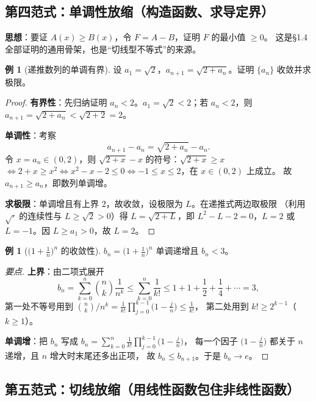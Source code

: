 \documentclass[11pt,a4paper]{ctexart}
\theoremstyle{definition}
\newtheorem{example}[theorem]{例}
\theoremstyle{remark}
\begin{document}
\subsection{第四范式：单调性放缩（构造函数、求导定界）}

\textbf{思想}：要证 $A(x)\ge B(x)$，令 $F=A-B$，证明 $F$ 的最小值 $\ge0$。
这是\S 1.4 全部证明的通用骨架，也是“切线型不等式”的来源。

\begin{example}[递推数列的单调有界]\label{ex:recursion}
设 $a_1=\sqrt2$，$a_{n+1}=\sqrt{2+a_n}$。证明 $\{a_n\}$ 收敛并求极限。
\end{example}

\begin{proof}
\textbf{有界性}：先归纳证明 $a_n<2$。$a_1=\sqrt2<2$；若 $a_n<2$，则
$a_{n+1}=\sqrt{2+a_n}<\sqrt{2+2}=2$。

\textbf{单调性}：考察
\[
  a_{n+1}-a_n=\sqrt{2+a_n}-a_n .
\]
令 $x=a_n\in(0,2)$，则 $\sqrt{2+x}-x$ 的符号：$\sqrt{2+x}\ge x$
$\iff 2+x\ge x^2\iff x^2-x-2\le0\iff -1\le x\le2$，在 $x\in(0,2)$ 上成立。
故 $a_{n+1}\ge a_n$，即数列单调增。

\textbf{求极限}：单调增且有上界 $2$，故收敛，设极限为 $L$。在递推式两边取极限
（利用 $\sqrt{\cdot}$ 的连续性与 $L\ge\sqrt2>0$）得 $L=\sqrt{2+L}$，即
$L^2-L-2=0$，$L=2$ 或 $L=-1$。因 $L\ge a_1>0$，故 $L=2$。
\end{proof}

\begin{example}[$\big(1+\frac1n\big)^n$ 的收敛性]
$b_n=\big(1+\frac1n\big)^{n}$ 单调递增且 $b_n<3$。
\end{example}

\begin{proof}[要点]
\textbf{上界}：由二项式展开
\[
  b_n=\sum_{k=0}^{n}\binom nk\frac{1}{n^{k}}
  \le\sum_{k=0}^{n}\frac{1}{k!}
  \le 1+1+\frac12+\frac14+\cdots=3,
\]
第一处不等号用到 $\binom nk/n^k=\frac{1}{k!}\prod_{j=0}^{k-1}\big(1-\frac jn\big)\le\frac{1}{k!}$，
第二处用到 $k!\ge2^{k-1}$（$k\ge1$）。

\textbf{单调增}：把 $b_n$ 写成 $b_n=\sum_{k=0}^{n}\frac{1}{k!}\prod_{j=0}^{k-1}\big(1-\frac jn\big)$，
每一个因子 $\big(1-\frac jn\big)$ 都关于 $n$ 递增，且 $n$ 增大时末尾还多出正项，
故 $b_n\le b_{n+1}$。于是 $b_n\to e$。
\end{proof}

\subsection{第五范式：切线放缩（用线性函数包住非线性函数）}
\end{document}
